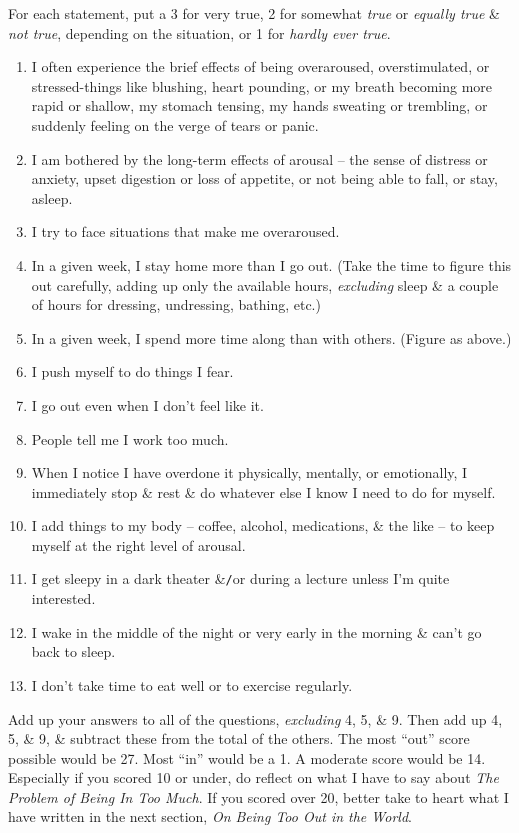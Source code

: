 \documentclass{article}
\numberwithin{equation}{section}
\begin{document}
For each statement, put a 3 for very true, 2 for somewhat \textit{true} or \textit{equally true} \& \textit{not true}, depending on the situation, or 1 for \textit{hardly ever true}.
\begin{enumerate}
	\item I often experience the brief effects of being overaroused, overstimulated, or stressed-things like blushing, heart pounding, or my breath becoming more rapid or shallow, my stomach tensing, my hands sweating or trembling, or suddenly feeling on the verge of tears or panic.
	\item I am bothered by the long-term effects of arousal -- the sense of distress or anxiety, upset digestion or loss of appetite, or not being able to fall, or stay, asleep.
	\item I try to face situations that make me overaroused.
	\item In a given week, I stay home more than I go out. (Take the time to figure this out carefully, adding up only the available hours, \textit{excluding} sleep \& a couple of hours for dressing, undressing, bathing, etc.)
	\item In a given week, I spend more time along than with others. (Figure as above.)
	\item I push myself to do things I fear.
	\item I go out even when I don't feel like it.
	\item People tell me I work too much.
	\item When I notice I have overdone it physically, mentally, or emotionally, I immediately stop \& rest \& do whatever else I know I need to do for myself.
	\item I add things to my body -- coffee, alcohol, medications, \& the like -- to keep myself at the right level of arousal.
	\item I get sleepy in a dark theater \&{\tt/}or during a lecture unless I'm quite interested.
	\item I wake in the middle of the night or very early in the morning \& can't go back to sleep.
	\item I don't take time to eat well or to exercise regularly.
\end{enumerate}
Add up your answers to all of the questions, \textit{excluding} 4, 5, \& 9. Then add up 4, 5, \& 9, \& subtract these from the total of the others. The most ``out'' score possible would be 27. Most ``in'' would be a 1. A moderate score would be 14. Especially if you scored 10 or under, do reflect on what I have to say about \textit{The Problem of Being In Too Much}. If you scored over 20, better take to heart what I have written in the next section, \textit{On Being Too Out in the World}.
\end{document}
